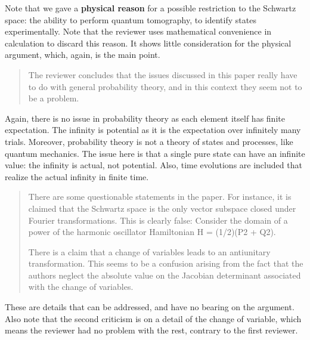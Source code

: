 \documentclass[11pt, executivepaper]{article}
\begin{document}
Note that we gave a \textbf{physical reason} for a possible restriction to the Schwartz space: the ability to perform quantum tomography, to identify states experimentally. Note that the reviewer uses mathematical convenience in calculation to discard this reason. It shows little consideration for the physical argument, which, again, is the main point.

\begin{quote}
The reviewer concludes that the issues discussed in this paper really have to
do with general probability theory, and in this context they seem not to be a
problem.
\end{quote}
Again, there is no issue in probability theory as each element itself has finite expectation. The infinity is potential as it is the expectation over infinitely many trials. Moreover, probability theory is not a theory of states and processes, like quantum mechanics. The issue here is that a single pure state can have an infinite value: the infinity is actual, not potential. Also, time evolutions are included that realize the actual infinity in finite time.


\begin{quote}
There are some questionable statements in the paper. For instance, it is
claimed that the Schwartz space is the only vector subspace closed under Fourier
transformations. This is clearly false: Consider the domain of a power of the
harmonic oscillator Hamiltonian H = (1/2)(P2 + Q2).

There is a claim that a change of variables leads to an antiunitary transformation.
This seems to be a confusion arising from the fact that the authors
neglect the absolute value on the Jacobian determinant associated with the
change of variables.
\end{quote}
These are details that can be addressed, and have no bearing on the argument. Also note that the second criticism is on a detail of the change of variable, which means the reviewer had no problem with the rest, contrary to the first reviewer.
\end{document}
